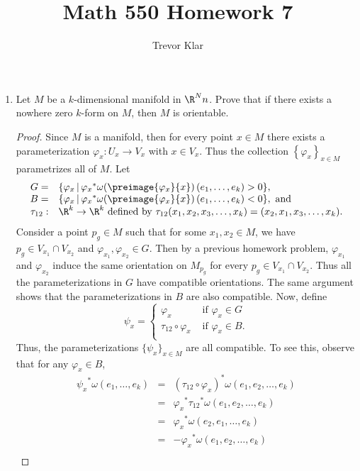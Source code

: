 \documentclass[letterpaper]{article}
\title{Math 550 \linebreak
Homework 7}
\author{Trevor Klar}
\begin{document}
\maketitle

\begin{enumerate}
	\item Let $M$ be a $k$-dimensional manifold in $\R^Nn$. Prove that if there exists a nowhere zero $k$-form on $M$, then $M$ is orientable.
		\begin{proof}
			Since $M$ is a manifold, then for every point $x\in M$ there exists a parameterization \mbox{$\varphi_x:U_x\to V_x$} with $x\in V_x$. Thus the collection $\left\{\varphi_x\right\}_{x\in M}$ parametrizes all of $M$. Let 
			\[\begin{array}{rl}
				G=&\{\varphi_x \,|\, {\varphi_x}^*\omega(\preimage{\varphi_x}{x})\left(e_1, \dots, e_k\right) > 0\},\\
			B=&\{\varphi_x \,|\, {\varphi_x}^*\omega(\preimage{\varphi_x}{x})\left(e_1, \dots, e_k\right) < 0\}, \text{ and }\\
			\tau_{12}:&\R^k\to\R^k \text{ defined by } \tau_{12}(x_1, x_2, x_3, \dots, x_k)=(x_2, x_1, x_3, \dots, x_k).
			\end{array}\]
		Consider a point $p_g\in M$ such that for some $x_1, x_2 \in M$, we have $p_g\in V_{x_1}\cap V_{x_2}$ and $\varphi_{x_1}, \varphi_{x_2}\in G$. Then by a previous homework problem, $\varphi_{x_1}$ and $\varphi_{x_2}$ induce the same orientation on $M_{p_g}$ for every $p_g\in V_{x_1}\cap V_{x_2}$. Thus all the parameterizations in $G$ have compatible orientations. The same argument shows that the parameterizations in $B$ are also compatible. Now, define 
		\[\psi_x=\begin{cases}
			\varphi_x & \text{ if } \varphi_x\in G\\
			\tau_{12}\circ\varphi_x & \text{ if } \varphi_x\in B.\\
		\end{cases}\]
		Thus, the parameterizations $\{\psi_x\}_{x\in M}$ are all compatible. To see this, observe that for any $\varphi_x\in B$, 
		\[\begin{array}{rcl}
			{\psi_x}^*\omega(e_1, \dots, e_k) &=& (\tau_{12}\circ\varphi_x)^*\omega(e_1, e_2, \dots, e_k)\\
			&=& {\varphi_x}^*{\tau_{12}}^*\omega(e_1, e_2, \dots, e_k)\\
			&=& {\varphi_x}^*\omega(e_2, e_1, \dots, e_k)\\
			&=& -{\varphi_x}^*\omega(e_1, e_2, \dots, e_k)\\

\end{array}\]
\end{proof}
\end{enumerate}
\end{document}
